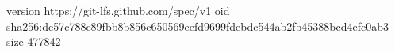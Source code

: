 version https://git-lfs.github.com/spec/v1
oid sha256:dc57c788c89fbb8b856c650569eefd9699fdebdc544ab2fb45388bcd4efc0ab3
size 477842
